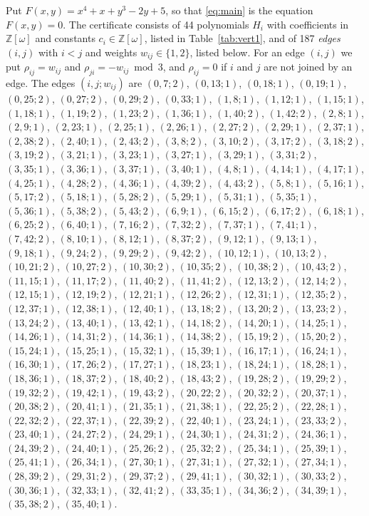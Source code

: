 \documentclass[11pt]{article}
\newcommand{\Z}{\mathbb{Z}}
\begin{document}
Put $F(x,y)=x^{4}+x+y^{3}-2y+5$, so that \eqref{eq:main} is the equation $F(x,y)=0$. The certificate consists of 44 polynomials $H_i$ with coefficients in $\Z[\omega]$ and constants $c_i\in\Z[\omega]$, listed in Table~\ref{tab:vert1}, and of 187 \emph{edges} $(i,j)$ with $i<j$ and weights $w_{ij}\in\{1,2\}$, listed below. For an edge $(i,j)$ we put $\rho_{ij}=w_{ij}$ and $\rho_{ji}=-w_{ij}\bmod 3$, and $\rho_{ij}=0$ if $i$ and $j$ are not joined by an edge.
The edges $(i,j;w_{ij})$ are $(0,7;2)$, $(0,13;1)$, $(0,18;1)$, $(0,19;1)$, $(0,25;2)$, $(0,27;2)$, $(0,29;2)$, $(0,33;1)$, $(1,8;1)$, $(1,12;1)$, $(1,15;1)$, $(1,18;1)$, $(1,19;2)$, $(1,23;2)$, $(1,36;1)$, $(1,40;2)$, $(1,42;2)$, $(2,8;1)$, $(2,9;1)$, $(2,23;1)$, $(2,25;1)$, $(2,26;1)$, $(2,27;2)$, $(2,29;1)$, $(2,37;1)$, $(2,38;2)$, $(2,40;1)$, $(2,43;2)$, $(3,8;2)$, $(3,10;2)$, $(3,17;2)$, $(3,18;2)$, $(3,19;2)$, $(3,21;1)$, $(3,23;1)$, $(3,27;1)$, $(3,29;1)$, $(3,31;2)$, $(3,35;1)$, $(3,36;1)$, $(3,37;1)$, $(3,40;1)$, $(4,8;1)$, $(4,14;1)$, $(4,17;1)$, $(4,25;1)$, $(4,28;2)$, $(4,36;1)$, $(4,39;2)$, $(4,43;2)$, $(5,8;1)$, $(5,16;1)$, $(5,17;2)$, $(5,18;1)$, $(5,28;2)$, $(5,29;1)$, $(5,31;1)$, $(5,35;1)$, $(5,36;1)$, $(5,38;2)$, $(5,43;2)$, $(6,9;1)$, $(6,15;2)$, $(6,17;2)$, $(6,18;1)$, $(6,25;2)$, $(6,40;1)$, $(7,16;2)$, $(7,32;2)$, $(7,37;1)$, $(7,41;1)$, $(7,42;2)$, $(8,10;1)$, $(8,12;1)$, $(8,37;2)$, $(9,12;1)$, $(9,13;1)$, $(9,18;1)$, $(9,24;2)$, $(9,29;2)$, $(9,42;2)$, $(10,12;1)$, $(10,13;2)$, $(10,21;2)$, $(10,27;2)$, $(10,30;2)$, $(10,35;2)$, $(10,38;2)$, $(10,43;2)$, $(11,15;1)$, $(11,17;2)$, $(11,40;2)$, $(11,41;2)$, $(12,13;2)$, $(12,14;2)$, $(12,15;1)$, $(12,19;2)$, $(12,21;1)$, $(12,26;2)$, $(12,31;1)$, $(12,35;2)$, $(12,37;1)$, $(12,38;1)$, $(12,40;1)$, $(13,18;2)$, $(13,20;2)$, $(13,23;2)$, $(13,24;2)$, $(13,40;1)$, $(13,42;1)$, $(14,18;2)$, $(14,20;1)$, $(14,25;1)$, $(14,26;1)$, $(14,31;2)$, $(14,36;1)$, $(14,38;2)$, $(15,19;2)$, $(15,20;2)$, $(15,24;1)$, $(15,25;1)$, $(15,32;1)$, $(15,39;1)$, $(16,17;1)$, $(16,24;1)$, $(16,30;1)$, $(17,26;2)$, $(17,27;1)$, $(18,23;1)$, $(18,24;1)$, $(18,28;1)$, $(18,36;1)$, $(18,37;2)$, $(18,40;2)$, $(18,43;2)$, $(19,28;2)$, $(19,29;2)$, $(19,32;2)$, $(19,42;1)$, $(19,43;2)$, $(20,22;2)$, $(20,32;2)$, $(20,37;1)$, $(20,38;2)$, $(20,41;1)$, $(21,35;1)$, $(21,38;1)$, $(22,25;2)$, $(22,28;1)$, $(22,32;2)$, $(22,37;1)$, $(22,39;2)$, $(22,40;1)$, $(23,24;1)$, $(23,33;2)$, $(23,40;1)$, $(24,27;2)$, $(24,29;1)$, $(24,30;1)$, $(24,31;2)$, $(24,36;1)$, $(24,39;2)$, $(24,40;1)$, $(25,26;2)$, $(25,32;2)$, $(25,34;1)$, $(25,39;1)$, $(25,41;1)$, $(26,34;1)$, $(27,30;1)$, $(27,31;1)$, $(27,32;1)$, $(27,34;1)$, $(28,39;2)$, $(29,31;2)$, $(29,37;2)$, $(29,41;1)$, $(30,32;1)$, $(30,33;2)$, $(30,36;1)$, $(32,33;1)$, $(32,41;2)$, $(33,35;1)$, $(34,36;2)$, $(34,39;1)$, $(35,38;2)$, $(35,40;1)$.
\end{document}
